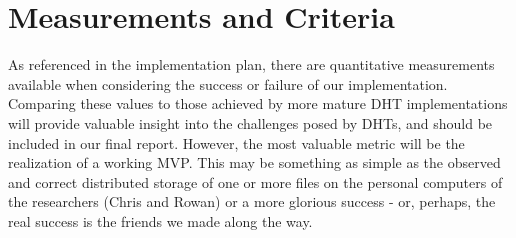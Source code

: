 \documentclass[12pt]{report}
\begin{document}
    \section{Measurements and Criteria}
    As referenced in the implementation plan, there are quantitative
    measurements available when considering the success or failure of our
    implementation.  Comparing these values to those achieved by more mature DHT
    implementations will provide valuable insight into the challenges posed by
    DHTs, and should be included in our final report.  However, the most
    valuable metric will be the realization of a working MVP.  This may be
    something as simple as the observed and correct distributed storage of one or more files on the
    personal computers of the researchers (Chris and Rowan) or a more glorious
    success - or, perhaps, the real success is the friends we made along the
    way.

%   
    
\end{document}

